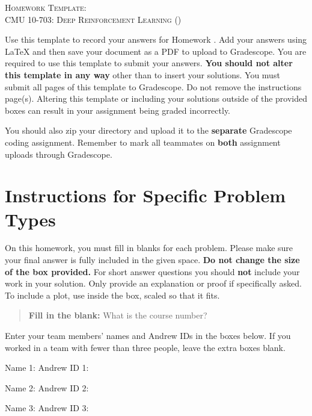\documentclass[11pt]{article}
\begin{document}
\begin{center}
  {\LARGE\scshape Homework \hwnum{} Template: \hwtitle}\\[0.5em]
  {\large\scshape CMU 10-703: Deep Reinforcement Learning (\semester)}
\end{center}

Use this template to record your answers for Homework \hwnum. Add your answers using \LaTeX{} and then save your document as a PDF to upload to Gradescope. You are required to use this template to submit your answers. \textbf{You should not alter this template in any way} other than to insert your solutions. You must submit all \pageref{LastPage} pages of this template to Gradescope. Do not remove the instructions page(s). Altering this template or including your solutions outside of the provided boxes can result in your assignment being graded incorrectly.

You should also zip your  directory and upload it to the \textbf{separate} Gradescope coding assignment. Remember to mark all teammates on \textbf{both} assignment uploads through Gradescope.

\section*{Instructions for Specific Problem Types}
On this homework, you must fill in blanks for each problem. Please make sure your final answer is fully included in the given space. \textbf{Do not change the size of the box provided.} For short answer questions you should \textbf{not} include your work in your solution. Only provide an explanation or proof if specifically asked. To include a plot, use  inside the box, scaled so that it fits.

\begin{quote}
  \textbf{Fill in the blank:} What is the course number?\quad {}
\end{quote}

\newpage
{}
Enter your team members' names and Andrew IDs in the boxes below. If you worked in a team with fewer than three people, leave the extra boxes blank.

\noindent Name 1: \hfill Andrew ID 1: \par\medskip
\noindent Name 2: \hfill Andrew ID 2: \par\medskip
\noindent Name 3: \hfill Andrew ID 3: \par\medskip
\end{document}
